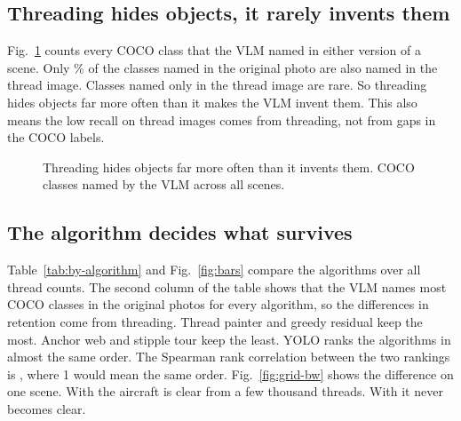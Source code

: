 \documentclass[conference]{IEEEtran}
\let\LaTeXcaption\caption
\let\caption\LaTeXcaption
\begin{document}
\subsection{Threading hides objects, it rarely invents them}

Fig.~\ref{fig:control} counts every COCO class that the VLM named in either version of a scene. Only \KeptPct\% of the classes named in the original photo are also named in the thread image. Classes named only in the thread image are rare. So threading hides objects far more often than it makes the VLM invent them. This also means the low recall on thread images comes from threading, not from gaps in the COCO labels.

\begin{figure}[t]
\centering
{}
\caption{Threading hides objects far more often than it invents them. COCO classes named by the VLM across all \PairedScenes{} scenes.}
\label{fig:control}
\end{figure}

\subsection{The algorithm decides what survives}

Table~\ref{tab:by-algorithm} and Fig.~\ref{fig:bars} compare the algorithms over all thread counts. The second column of the table shows that the VLM names most COCO classes in the original photos for every algorithm, so the differences in retention come from threading. Thread painter and greedy residual keep the most. Anchor web and stipple tour keep the least. YOLO ranks the algorithms in almost the same order. The Spearman rank correlation between the two rankings is \RankCorr{}, where 1 would mean the same order. Fig.~\ref{fig:grid-bw} shows the difference on one scene. With \BestAlgo{} the aircraft is clear from a few thousand threads. With \WorstAlgo{} it never becomes clear.
\end{document}
